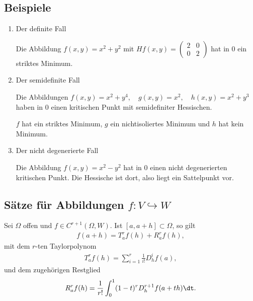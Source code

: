 \subsection{Beispiele}

\begin{enumerate}
  \item Der definite Fall
  
  Die Abbildung $f(x,y) = x^2+y^2$ mit $Hf(x,y) = \begin{pmatrix}2
  & 0 \\ 0 & 2\end{pmatrix}$ hat in $0$ ein striktes Minimum.

  \item Der semidefinite Fall
  
  Die Abbildungen $f(x,y) = x^2+y^4,\quad g(x,y) = x^2,\quad h(x,y) = x^2+y^3$
  haben in $0$ einen kritischen Punkt mit semidefiniter Hessischen.
  
  $f$ hat ein striktes Minimum, $g$ ein nichtisoliertes Minimum und $h$ hat
  kein Minimum.
  
  \item Der nicht degenerierte Fall
  
  Die Abbildung $f(x,y) = x^2-y^2$ hat in $0$ einen nicht degenerierten
  kritischen Punkt. Die Hessische ist dort, also liegt ein
  Sattelpunkt vor.
\end{enumerate}

\subsection{Sätze für Abbildungen $f: V\hookrightarrow W$}
\begin{prop}
Sei $\Omega$ offen und $f\in C^{r+1}(\Omega,W)$. Ist $[a,a+h]\subset\Omega$, so
gilt
\begin{align*}
f(a+h) = T_a^rf(h) + R_a^rf(h), 
\end{align*}
mit dem $r$-ten Taylorpolynom
\begin{align*}
T_a^rf(h) = \sum\limits_{i=1}^r \frac{1}{i!}D_h^if(a), 
\end{align*}
und dem zugehörigen Restglied
\begin{align*}
R_a^rf(h) = \frac{1}{r!}\int_0^1 (1-t)^r D_h^{r+1}f(a+th)\dt.
\end{align*}
\end{prop}

